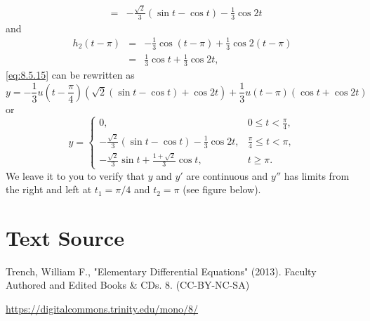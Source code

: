 \documentclass{ximera}
\begin{document}
\begin{example}
\begin{explanation}
\begin{eqnarray*}
&=&-\frac{\sqrt{2}}{3} (\sin t-\cos t)-\frac{1}{3}\cos2t
\end{eqnarray*}
and
\begin{eqnarray*}
h_2(t-\pi)&=&-\frac{1}{3}\cos (t-\pi)+\frac{1}{3}\cos2(t-\pi)\\
&=&\frac{1}{3}\cos t+\frac{1}{3}\cos2t,
\end{eqnarray*}
 \eqref{eq:8.5.15} can be rewritten as
$$
y=-\frac{1}{3}u\left(t-\frac{\pi}{4}\right)\left(\sqrt{2}(\sin
t-\cos t)+\cos2t\right)
+ \frac{1}{3} u(t-\pi) (\cos t+\cos2t)
$$
or
\begin{equation}\label{eq:8.5.16}
y=\left\{\begin{array}{cl}
0,&0\leq t<\frac{\pi}{4},\\
-\frac{\sqrt{2}}{3}(\sin t-\cos t)-\frac{1}{3}\cos2t,&\frac{\pi}{4}\leq t<\pi,\\
-\frac{\sqrt{2}}{3}\sin t+\frac{1+\sqrt{2}}{3}\cos t ,&t\geq\pi.
\end{array}\right.
\end{equation}
We leave it to you to verify that $y$ and $y'$ are continuous and
$y''$ has limits from the right and left at $t_1=\pi/4$ and $t_2=\pi$
(see figure below).

\begin{center}
\end{center}


\end{explanation}
\end{example}

\section*{Text Source}
Trench, William F., "Elementary Differential Equations" (2013). Faculty Authored and Edited Books \& CDs. 8. (CC-BY-NC-SA)

\href{https://digitalcommons.trinity.edu/mono/8/}{https://digitalcommons.trinity.edu/mono/8/}
\end{document}
